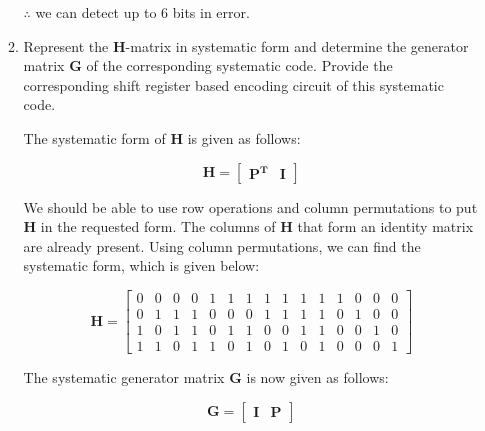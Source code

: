 \documentclass[fleqn]{article}
\begin{document}
\begin{enumerate}
\begin{enumerate}
			$\therefore$ we can detect up to 6 bits in error.
			

			\item Represent the $\mathbf{H}$-matrix in systematic form and determine the generator matrix $\mathbf{G}$ of the corresponding systematic code. Provide the corresponding shift register based encoding circuit of this systematic code.
			
			The systematic form of $\mathbf{H}$ is given as follows:
			
			\begin{equation*}
				\mathbf{H} = \left[\begin{array}{c|c}
					\mathbf{P^T} & \mathbf{I}
				\end{array}\right]
			\end{equation*}
			
			We should be able to use row operations and column permutations to put $\mathbf{H}$ in the requested form. The columns of $\mathbf{H}$ that form an identity matrix are already present. Using column permutations, we can find the systematic form, which is given below:
			
			\begin{equation*}
				\mathbf{H} = \begin{bmatrix}
					0 & 0 & 0 & 0 & 1 & 1 & 1 & 1 & 1 & 1 & 1 & 1 & 0 & 0 & 0 \\
					0 & 1 & 1 & 1 & 0 & 0 & 0 & 1 & 1 & 1 & 1 & 0 & 1 & 0 & 0 \\
					1 & 0 & 1 & 1 & 0 & 1 & 1 & 0 & 0 & 1 & 1 & 0 & 0 & 1 & 0 \\
					1 & 1 & 0 & 1 & 1 & 0 & 1 & 0 & 1 & 0 & 1 & 0 & 0 & 0 & 1
				\end{bmatrix}
			\end{equation*}
		
			The systematic generator matrix $\mathbf{G}$ is now given as follows:
			
			\begin{equation*}
				\mathbf{G} = \left[\begin{array}{c|c}
					\mathbf{I} & \mathbf{P}
				\end{array}\right]
			\end{equation*}
			

\end{enumerate}
\end{enumerate}
\end{document}
